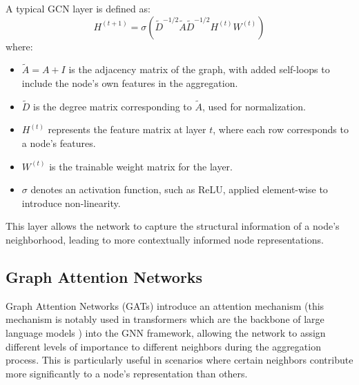 A typical GCN layer is defined as:
  \begin{equation}
    H^{(t+1)} = \sigma \left( \tilde{D}^{-1/2} \tilde{A} \tilde{D}^{-1/2} H^{(t)} W^{(t)} \right)
  \end{equation}
where:
\begin{itemize}
  \item \( \tilde{A} = A + I \) is the adjacency matrix of the graph, with added
  self-loops to include the node's own features in the aggregation.
  \item \( \tilde{D} \) is the degree matrix corresponding to \( \tilde{A} \),
  used for normalization.
  \item \( H^{(t)} \) represents the feature matrix at layer \( t \), where each
  row corresponds to a node's features.
  \item \( W^{(t)} \) is the trainable weight matrix for the layer.
  \item \( \sigma \) denotes an activation function, such as ReLU, applied
  element-wise to introduce non-linearity.
\end{itemize}
This layer allows the network to capture the structural information of a node's
neighborhood, leading to more contextually informed node representations.

\subsection{Graph Attention Networks}
Graph Attention Networks (GATs) \cite{velivckovic2017graph} introduce an
attention mechanism (this mechanism is notably used in transformers
\cite{vaswani2017attention} which are the backbone of large language models
\cite{zhao2023survey}) into the GNN framework, allowing the network to assign
different levels of importance to different neighbors during the aggregation
process. This is particularly useful in scenarios where certain neighbors
contribute more significantly to a node's representation than others.

